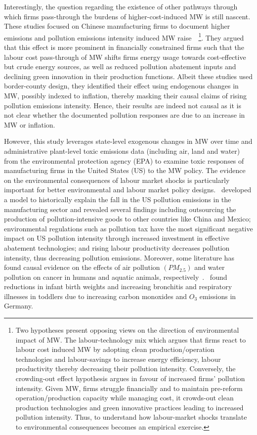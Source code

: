 \documentclass[12pt, english]{article}
\begin{document}
    Interestingly, the question regarding the existence of other pathways through which firms pass-through the burdens of higher-cost-induced MW is still nascent. These studies focused on Chinese manufacturing firms to document higher emissions and pollution emissions intensity induced MW raise~\parencite{li2023does, zhang2023unintended}~\footnote{\tiny Two hypotheses present opposing views on the direction of environmental impact of MW. The labour-technology mix which argues that firms react to labour cost induced MW by adopting clean production/operation technologies and labour-savings to increase energy efficiency, labour productivity thereby decreasing their pollution intensity. Conversely, the crowding-out effect hypothesis argues in favour of increased firms' pollution intensity. Given MW, firms struggle financially and to maintain pre-reform operation/production capacity while managing cost, it crowds-out clean production technologies and green innovative practices leading to increased pollution intensity. Thus, to understand how labour-market shocks translate to environmental consequences becomes an empirical exercise.}. They argued that this effect is more prominent in financially constrained firms such that the labour cost pass-through of MW shifts firms energy usage towards cost-effective but crude energy sources, as well as reduced pollution abatement inputs and declining green innovation in their production functions. Albeit these studies used border-county design, they identified their effect using endogenous changes in MW, possibly indexed to inflation, thereby masking their causal claims of rising pollution emissions intensity. Hence, their results are indeed not causal as it is not clear whether the documented pollution responses are due to an increase in MW or inflation.

    However, this study leverages state-level exogenous changes in MW over time and administrative plant-level toxic emissions data (including air, land and water) from the environmental protection agency (EPA) to examine toxic responses of manufacturing firms in the United States (US) to the MW policy. The evidence on the environmental consequences of labour market shocks is particularly important for better environmental and labour market policy designs.~\cite{shapiro2018pollution} developed a model to historically explain the fall in the US pollution emissions in the manufacturing sector and revealed several findings including outsourcing the production of pollution-intensive goods to other countries like China and Mexico; environmental regulations such as pollution tax have the most significant negative impact on US pollution intensity through increased investment in effective abatement technologies; and rising labour productivity decreases pollution intensity, thus decreasing pollution emissions. Moreover, some literature has found causal evidence on the effects of air pollution $(PM_{2.5})$ and water pollution on cancer in humans and aquatic animals, respectively~\parencite{turner2020outdoor, turner2017ambient, baines2021linking}.~\cite{coneus2012pollution} found reductions in infant birth weights and increasing bronchitis and respiratory illnesses in toddlers due to increasing carbon monoxides and $O_{3}$ emissions in Germany.
\end{document}
